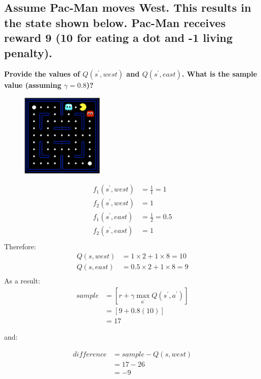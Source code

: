 \documentclass{homework}
\begin{document}
\clearpage
\subsection{Assume Pac-Man moves West. This results in the state shown below. Pac-Man receives reward 9 (10 for eating a dot and -1 living penalty).}
\textbf{\large Provide the values of $Q(s^{\prime}, west)$ and $Q(s^{\prime}, east)$. What is the sample value (assuming $\gamma = 0.8$)?}

\begin{figure}[h!]
    \centering
    \includegraphics[width=0.35\textwidth]{figures/q72.png}
\end{figure}
\begin{align*}
    f_1(s^{\prime}, west) &= \frac{1}{1} = 1 \\
    f_2(s^{\prime}, west) &= 1 \\
    f_1(s^{\prime}, east) &= \frac{1}{2} = 0.5 \\
    f_2(s^{\prime}, east) &= 1 \\
\end{align*}
Therefore:
\begin{align*}
    Q(s, west) &= 1 \times 2 + 1 \times 8 = 10 \\
    Q(s, east) &= 0.5 \times 2 + 1 \times 8 = 9 \\
\end{align*}
As a result:
\begin{align*}
    sample &= [r + \gamma \max\limits_{a^{\prime}}{Q(s^{\prime}, a^{\prime})}] \\
    &= [9 + 0.8 (10)] \\
    &= 17
\end{align*}

and:

\begin{align*}
    difference &= sample - Q(s, west) \\
    &= 17 - 26 \\
    &= -9
\end{align*}
\end{document}
